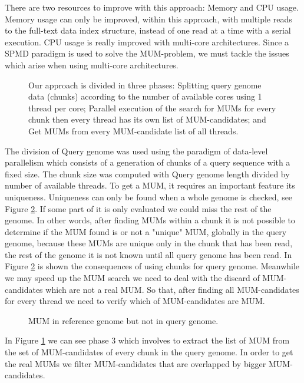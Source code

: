 \documentclass{acm_proc_article-sp}
\begin{document}
There are two resources to improve with this approach: Memory and CPU usage. Memory usage can only be improved, within this approach, with multiple reads to the full-text data index structure, instead of one read at a time with a serial execution. CPU usage is really improved with multi-core architectures. Since a SPMD paradigm is used to solve the MUM-problem, we must tackle the issues which arise when using multi-core architectures.
\begin{figure}  
\centering 
\caption{Our approach is divided in three phases: Splitting query genome data (chunks) according to the number of available cores using 1 thread per core; Parallel execution of the search for MUMs for every chunk then every thread has its own list of MUM-candidates; and Get MUMs from every MUM-candidate list of all threads.}
  \label{phases}
\end{figure}
The division of Query genome  was used using the paradigm of data-level parallelism which consists of a generation of chunks of a query sequence with a fixed size. The chunk size was computed with Query genome length divided by number of available threads. To get a MUM, it requires an important feature its uniqueness. Uniqueness can only be found when a whole genome is checked, see Figure \ref{Whole-MUM}. If some part of it is only evaluated we could miss the rest of the genome. In other words, after finding MUMs within a chunk it is not possible to determine if the MUM found is or not a "unique" MUM, globally in the query genome,  because these MUMs are unique only in the chunk that has been read, the rest of the genome it is not known until all query genome has been read. In Figure \ref{Whole-MUM} is shown the consequences of using chunks for query genome. Meanwhile we may speed up the MUM search we need to deal with the discard of MUM-candidates which are not a real MUM. So that, after finding all MUM-candidates for every thread we need to verify which of MUM-candidates are MUM.
\begin{figure}  
\centering 
\caption{MUM in reference genome but not in query genome.} 
\label{Whole-MUM} 
\end{figure}
In Figure \ref{phases} we can see phase 3 which involves to extract the list of MUM from the set of MUM-candidates of every chunk in the query genome. In order to get the real MUMs we filter MUM-candidates that are overlapped by bigger MUM-candidates.
\end{document}
